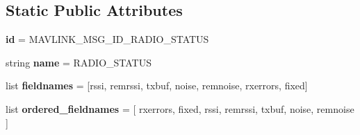 \subsection*{Static Public Attributes}
\begin{DoxyCompactItemize}
\item 
\mbox{\label{classpymavlink_1_1dialects_1_1v10_1_1MAVLink__radio__status__message_ae88aa737e6bb6664a1ac4c2a1b254f2a}} 
{\bfseries id} = M\+A\+V\+L\+I\+N\+K\+\_\+\+M\+S\+G\+\_\+\+I\+D\+\_\+\+R\+A\+D\+I\+O\+\_\+\+S\+T\+A\+T\+US
\item 
\mbox{\label{classpymavlink_1_1dialects_1_1v10_1_1MAVLink__radio__status__message_aedb3cdbb887ca32a191dbdecad09fcdc}} 
string {\bfseries name} = \textquotesingle{}R\+A\+D\+I\+O\+\_\+\+S\+T\+A\+T\+US\textquotesingle{}
\item 
\mbox{\label{classpymavlink_1_1dialects_1_1v10_1_1MAVLink__radio__status__message_ad9b854fa01d18195a929a34d619a1e90}} 
list {\bfseries fieldnames} = \mbox{[}\textquotesingle{}rssi\textquotesingle{}, \textquotesingle{}remrssi\textquotesingle{}, \textquotesingle{}txbuf\textquotesingle{}, \textquotesingle{}noise\textquotesingle{}, \textquotesingle{}remnoise\textquotesingle{}, \textquotesingle{}rxerrors\textquotesingle{}, \textquotesingle{}fixed\textquotesingle{}\mbox{]}
\item 
\mbox{\label{classpymavlink_1_1dialects_1_1v10_1_1MAVLink__radio__status__message_acfd1d7892f334933d9d1833f0031cd2c}} 
list {\bfseries ordered\+\_\+fieldnames} = \mbox{[} \textquotesingle{}rxerrors\textquotesingle{}, \textquotesingle{}fixed\textquotesingle{}, \textquotesingle{}rssi\textquotesingle{}, \textquotesingle{}remrssi\textquotesingle{}, \textquotesingle{}txbuf\textquotesingle{}, \textquotesingle{}noise\textquotesingle{}, \textquotesingle{}remnoise\textquotesingle{} \mbox{]}
\item 
\mbox{\label{classpymavlink_1_1dialects_1_1v10_1_1MAVLink__radio__status__message_ab79b70c1213f9fe9b6420a37cf840595}} 

\end{DoxyCompactItemize}
